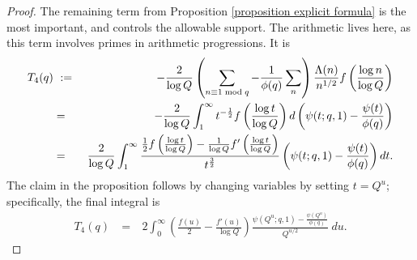 \documentclass[12pt,reqno]{amsart}
\numberwithin{equation}{section}
\theoremstyle{plain}
\begin{document}
\begin{proof}
The remaining term from Proposition \ref{proposition explicit formula} is the most important, and controls the allowable support. The arithmetic lives here, as this term involves primes in arithmetic progressions. It is
\begin{eqnarray}\label{penultimate prime sum} T_4(q) & \ := \ &  -\frac{2}{\log Q} \left(\sum_{n\equiv 1 \bmod q}-\frac 1{\phi(q)}\sum_{n} \right)\frac{\Lambda(n)}{n^{1/2}} f\left(
\frac{\log n}{\log Q}\right) \nonumber\\
&=&  -\frac{2}{\log Q} \int_1^{\infty} t^{-\frac 12} f\left( \frac{\log t}{\log Q}\right) d\left(\psi(t;q,1)-\frac{\psi(t)}{\phi(q)}\right) \notag \\
&=& \frac{2}{\log Q} \int_1^{\infty} \frac{\frac 12 f\left( \frac{\log t}{\log Q}\right)-\frac 1{\log Q}f'\left( \frac{\log t}{\log Q}\right) }{t^{\frac 32}}\left(\psi(t;q,1)-\frac{\psi(t)}{\phi(q)}\right) dt. \end{eqnarray}
The claim in the proposition follows by changing variables by setting $t = Q^u$; specifically, the final integral is
\begin{eqnarray}\label{prime sum term} T_4(q)
&\ = \ &2 \int_0^{\infty} \left(\frac {f(u)}2 -\frac {f'(u)}{\log Q}\right)\frac{\psi(Q^u;q,1)-\frac{\psi(Q^u)}{\phi(q)}}{Q^{u/2}}\ du.
\end{eqnarray}


\end{proof}
\end{document}
